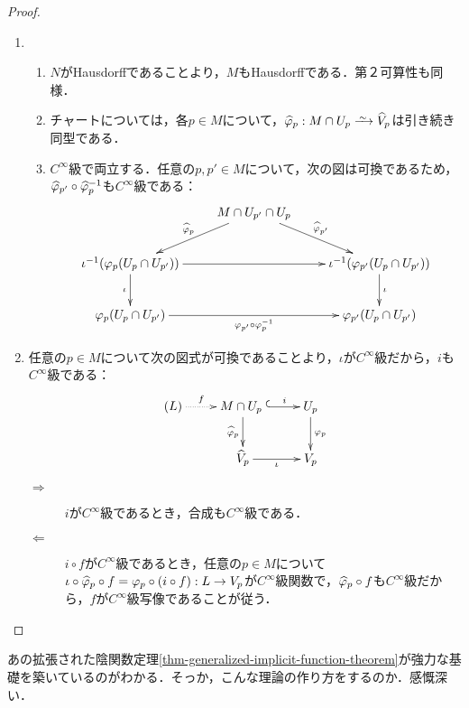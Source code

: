 \documentclass[uplatex,dvipdfmx]{jsreport}
\begin{document}
\begin{proof}\mbox{}
    \begin{enumerate}
        \item \begin{enumerate}[a]
            \item $N$がHausdorffであることより，$M$もHausdorffである．第２可算性も同様．
            \item チャートについては，各$p\in M$について，$\wh{\varphi}_p:M\cap U_p\iso\wh{V}_p$は引き続き同型である．
            \item $C^\infty$級で両立する．任意の$p,p'\in M$について，次の図は可換であるため，$\widehat{\varphi}_{p'}\circ\widehat{\varphi}_p^{-1}$も$C^\infty$級である：
            \[\xymatrix{
                &M\cap U_{p'}\cap U_p\ar[dl]_-{\wh{\varphi}_p}\ar[dr]^-{\wh{\varphi}_{p'}}\\
                \iota^{-1}(\varphi_p(U_p\cap U_{p'}))\ar[rr]\ar[d]_-\iota&&\iota^{-1}(\varphi_{p'}(U_p\cap U_{p'}))\ar[d]^-\iota\\
                \varphi_{p}(U_p\cap U_{p'})\ar[rr]_-{\varphi_{p'}\circ\varphi_p^{-1}}&&\varphi_{p'}(U_p\cap U_{p'})
            }\]
        \end{enumerate}
        \item 任意の$p\in M$について次の図式が可換であることより，$\iota$が$C^\infty$級だから，$i$も$C^\infty$級である：
        \[\xymatrix{
            (L)\ar@{.>}[r]^-{f}&M\cap U_p\;\ar@{^{(}->}[r]^-i\ar[d]_-{\wh{\varphi}_p}&U_p\ar[d]^-{\varphi_p}\\
            &\wh{V}_p\ar[r]_-{\iota}&V_p
        }\]
        \begin{description}
            \item[$\Rightarrow$] $i$が$C^\infty$級であるとき，合成も$C^\infty$級である．
            \item[$\Leftarrow$] $i\circ f$が$C^\infty$級であるとき，任意の$p\in M$について$\iota\circ\widehat{\varphi}_p\circ f=\varphi_p\circ(i\circ f):L\to V_p$が$C^\infty$級関数で，$\widehat{\varphi}_p\circ f$も$C^\infty$級だから，$f$が$C^\infty$級写像であることが従う．
        \end{description}
    \end{enumerate}
\end{proof}
\begin{remarks}
    あの拡張された陰関数定理\ref{thm-generalized-implicit-function-theorem}が強力な基礎を築いているのがわかる．そっか，こんな理論の作り方をするのか．感慨深い．
\end{remarks}
\end{document}
